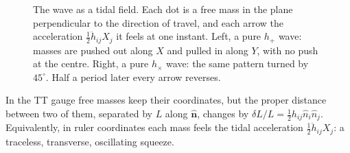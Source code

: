 \begin{figure}[htbp]
\centering
{}
\caption{The wave as a tidal field. Each dot is a free mass in the plane perpendicular to the direction of travel, and each arrow the acceleration $\tfrac12\ddot h_{ij}X_j$ it feels at one instant. Left, a pure $h_+$ wave: masses are pushed out along $X$ and pulled in along $Y$, with no push at the centre. Right, a pure $h_\times$ wave: the same pattern turned by $45^\circ$. Half a period later every arrow reverses.}
\label{T2g:fig:tidal}
\end{figure}

\begin{keyidea}
In the TT gauge free masses keep their coordinates, but the proper distance between two of them, separated by $L$ along $\hat{\bm n}$, changes by $\delta L/L=\tfrac12h_{ij}\hat n_i\hat n_j$. Equivalently, in ruler coordinates each mass feels the tidal acceleration $\tfrac12\ddot h_{ij}X_j$: a traceless, transverse, oscillating squeeze.
\end{keyidea}

